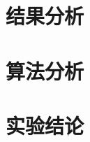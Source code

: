 \documentclass[11pt]{article}
\begin{document}
\section{结果分析}

\section{算法分析}


\section{实验结论}
\end{document}
